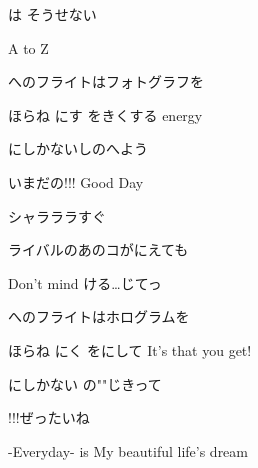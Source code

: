 \documentclass[14pt]{ltjsarticle}
\begin{document}
{  は そうせない
  \jisho{}

  
A to Z
  \jisho{}

\item
  へのフライトはフォトグラフを
  \jisho{}

  
ほらね にす をきくする energy
  \jisho{}

  にしかないしのへよう
  \jisho{}

  
いまだの!!! Good Day
  \jisho{}

  
シャラララすぐ
  \jisho{}

\item
  
ライバルのあのコがにえても
  \jisho{}

  
Don't mind ける…じてっ
  \jisho{}

\item
  へのフライトはホログラムを
  \jisho{}

  
ほらね にく をにして It's that you get!
  \jisho{}

  にしかない の""じきって
  \jisho{}

  !!!ぜったいね
  \jisho{}

  
-Everyday- is My beautiful life's dream
  \jisho{}

}
\end{document}

